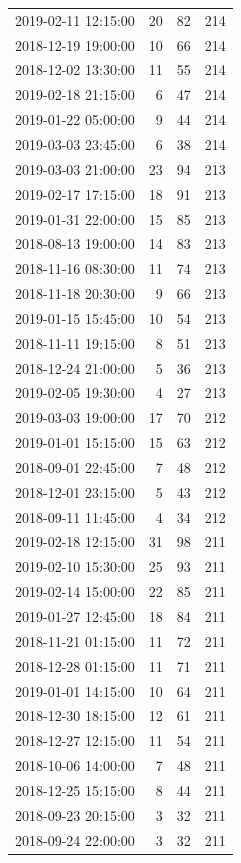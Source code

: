 \begin{tabular}{lrrr}
2019-02-11 12:15:00 & 20 & 82 & 214 \\
2018-12-19 19:00:00 & 10 & 66 & 214 \\
2018-12-02 13:30:00 & 11 & 55 & 214 \\
2019-02-18 21:15:00 & 6 & 47 & 214 \\
2019-01-22 05:00:00 & 9 & 44 & 214 \\
2019-03-03 23:45:00 & 6 & 38 & 214 \\
2019-03-03 21:00:00 & 23 & 94 & 213 \\
2019-02-17 17:15:00 & 18 & 91 & 213 \\
2019-01-31 22:00:00 & 15 & 85 & 213 \\
2018-08-13 19:00:00 & 14 & 83 & 213 \\
2018-11-16 08:30:00 & 11 & 74 & 213 \\
2018-11-18 20:30:00 & 9 & 66 & 213 \\
2019-01-15 15:45:00 & 10 & 54 & 213 \\
2018-11-11 19:15:00 & 8 & 51 & 213 \\
2018-12-24 21:00:00 & 5 & 36 & 213 \\
2019-02-05 19:30:00 & 4 & 27 & 213 \\
2019-03-03 19:00:00 & 17 & 70 & 212 \\
2019-01-01 15:15:00 & 15 & 63 & 212 \\
2018-09-01 22:45:00 & 7 & 48 & 212 \\
2018-12-01 23:15:00 & 5 & 43 & 212 \\
2018-09-11 11:45:00 & 4 & 34 & 212 \\
2019-02-18 12:15:00 & 31 & 98 & 211 \\
2019-02-10 15:30:00 & 25 & 93 & 211 \\
2019-02-14 15:00:00 & 22 & 85 & 211 \\
2019-01-27 12:45:00 & 18 & 84 & 211 \\
2018-11-21 01:15:00 & 11 & 72 & 211 \\
2018-12-28 01:15:00 & 11 & 71 & 211 \\
2019-01-01 14:15:00 & 10 & 64 & 211 \\
2018-12-30 18:15:00 & 12 & 61 & 211 \\
2018-12-27 12:15:00 & 11 & 54 & 211 \\
2018-10-06 14:00:00 & 7 & 48 & 211 \\
2018-12-25 15:15:00 & 8 & 44 & 211 \\
2018-09-23 20:15:00 & 3 & 32 & 211 \\
2018-09-24 22:00:00 & 3 & 32 & 211 \\

\end{tabular}
